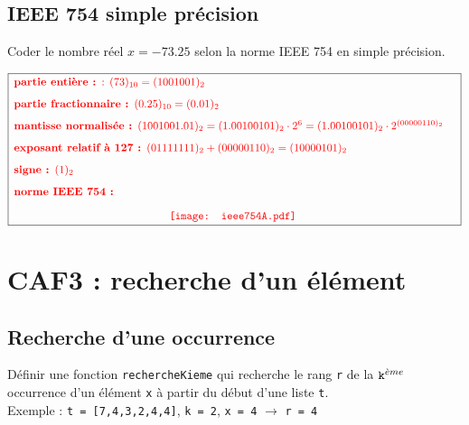 \subsection*{IEEE 754 simple précision}
Coder le nombre réel $x=-73.25$ selon la norme IEEE 754 en simple précision.
	
	$$\framebox[14.5cm]{\color{red}
\begin{minipage}{14cm}
\begin{description}
\item[partie entière :] : $(73)_{10} = (1001001)_2$
\item[partie fractionnaire :] $(0.25)_{10} = (0.01)_2$
\item[mantisse normalisée :] $(1001001.01)_2 =
(1.00100101)_2 \cdot 2^6 = (1.00100101)_2 \cdot 2^{(00000110)_2}$
\item[exposant relatif à 127 :] $(01111111)_2 + (00000110)_2 = (10000101)_2$
\item[signe :] $(1)_2$
\item[norme IEEE 754 :]
\end{description}
\centerline{\texttt{[image: ieee754A.pdf]}}
\end{minipage}
}$$


\newpage
\section*{CAF3 : recherche d'un élément}\label{caf3}

\subsection*{Recherche d'une occurrence}
Définir une fonction {\tt rechercheKieme} qui recherche le rang {\tt r}
de la $\mbox{\tt k}^{\grave eme}$ occurrence d'un élément {\tt x} à partir du début 
d'une liste {\tt t}.\\
Exemple : {\tt t = [7,4,3,2,4,4]}, {\tt k = 2}, {\tt x = 4} $\rightarrow$ {\tt r
= 4}

